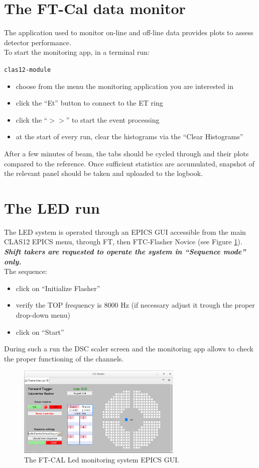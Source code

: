 \documentclass[11.5pt]{article}
\begin{document}
\section{The FT-Cal data monitor}
The application used to monitor on-line and off-line data provides plots to assess detector performance.\\  
To start the monitoring app, in a terminal run:
\begin{center}
\texttt{clas12-module}
\end{center}
\begin{itemize}
\item choose from the menu the monitoring application you are interested in
\item click the ``Et'' button to connect to the ET ring
\item click the ``$>>$'' to start the event processing
\item at the start of every run, clear the histograms via the ``Clear Histograms''
\end{itemize}
After a few minutes of beam, the tabs should be cycled through and their plots compared to the reference.  Once sufficient statistics are accumulated, snapshot of the relevant panel should be taken and uploaded to the logbook.

\section{The LED run}
The LED system is operated through an EPICS GUI accessible from the main CLAS12 EPICS menu, through FT, then FTC-Flasher Novice (see Figure \ref{FlasherMEDM}).\\
\textbf{\textit{Shift takers are requested to operate the system in ``Sequence mode'' only.}} \\
The sequence:
\begin{itemize}
\item click on ``Initialize Flasher''
\item verify the TOP frequency is 8000 Hz (if necessary adjust it trough the proper drop-down menu)
\item click on ``Start''
\end{itemize}
During such a run the DSC scaler screen and the monitoring app allows to check the proper functioning of the channels.
\begin{figure}[htbp]
\center
\includegraphics[width=0.7\textwidth]{pics/FTC_flasher.png}
\caption{ \label{FlasherMEDM} The FT-CAL Led monitoring system EPICS GUI.}
\end{figure}
\end{document}
